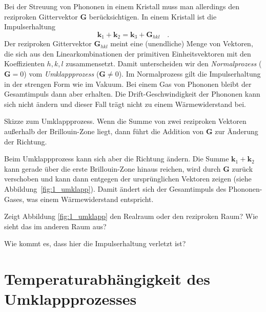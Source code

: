 Bei der Streuung von Phononen in einem Kristall muss man allerdings den reziproken Gittervektor $\mathbf{G}$ berücksichtigen. In einem Kristall ist die Impulserhaltung
\begin{equation}
    \mathbf{k}_1 +  \mathbf{k}_2 =  \mathbf{k}_3 +  \mathbf{G}_{hkl}  \quad .
\end{equation}
Der reziproken Gittervektor $\mathbf{G}_{hkl}$ meint eine (unendliche) Menge von Vektoren, die sich aus den Linearkombinationen der primitiven Einheitsvektoren mit den Koeffizienten $h,k,l$ zusammensetzt. Damit unterscheiden wir den \emph{Normalprozess} ($\mathbf{G} = 0$) vom \emph{Umklappprozess} ($\mathbf{G} \neq 0$). Im Normalprozess gilt die Impulserhaltung in der strengen Form wie im Vakuum. Bei einem Gas von Phononen bleibt der Gesamtimpuls dann aber erhalten. Die Drift-Geschwindigkeit der Phononen kann sich nicht ändern und dieser Fall trägt nicht zu einem Wärmewiderstand bei.

\begin{marginfigure}
   \caption{Skizze zum Umklappprozess. Wenn die Summe von zwei reziproken Vektoren außerhalb der Brillouin-Zone liegt, dann führt die Addition von $\mathbf{G}$ zur Änderung der Richtung. }
   \label{fig:1_umklapp}
\end{marginfigure}

Beim Umklappprozess kann sich aber die Richtung ändern. Die Summe $ \mathbf{k}_1 +  \mathbf{k}_2 $ kann gerade über die erste Brillouin-Zone hinaus reichen, wird durch $\mathbf{G}$ zurück verschoben und kann dann entgegen der ursprünglichen Vektoren zeigen (siehe Abbildung~\ref{fig:1_umklapp}). Damit ändert sich der Gesamtimpuls des Phononen-Gases, was einem Wärmewiderstand entspricht.

\begin{questions} 
    \item Zeigt Abbildung \ref{fig:1_umklapp} den Realraum oder den reziproken Raum?  Wie sieht das im anderen Raum aus?
    \item Wie kommt es, dass hier die Impulserhaltung verletzt ist?
\end{questions}
     

\section{Temperaturabhängigkeit des Umklappprozesses}

